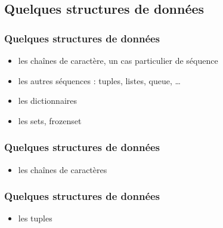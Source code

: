 
\subsection{Quelques structures de données}
\begin{frame}
  \frametitle{Quelques structures de données}
  \begin{itemize}
      \item<1-> les chaînes de caractère, un cas particulier de séquence
      \item<2-> les autres séquences : tuples, listes, queue, \ldots
      \item<3-> les dictionnaires
      \item<4-> les sets, frozenset
    \end{itemize}
\end{frame}

\begin{frame}[fragile]
  \frametitle{Quelques structures de données}
    \begin{itemize}
      \item les chaînes de caractères
    \end{itemize}
    \begin{ipython}
    \end{ipython}
\end{frame}

\begin{frame}[fragile]
  \frametitle{Quelques structures de données}
    \begin{itemize}
      \item les tuples
    \end{itemize}
    \begin{ipython}
    \end{ipython}
\end{frame}


